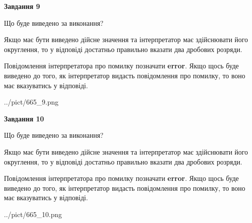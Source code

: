 \documentclass[12pt, ukrainian]{article}
\begin{document}
{\begin {Large}
{\begin {center}\textbf{Завдання 9}\end {center}}\par
Що буде виведено за виконання? \par

Якщо має бути виведено дійсне значення та інтерпретатор має здійснювати його округлення, 
то у відповіді достатньо правильно вказати два дробових розряди.

Повідомлення інтерпретатора про помилку позначати \textbf{error}.
Якщо щось буде виведено до того, як інтерпретатор видасть повідомлення про помилку, 
то воно має вказуватись у відповіді. \par

\begin{center}
	{../pict/665_9.png}
\end{center}
\newpage

{\begin {center}\textbf{Завдання 10}\end {center}}\par
Що буде виведено за виконання? \par

Якщо має бути виведено дійсне значення та інтерпретатор має здійснювати його округлення, 
то у відповіді достатньо правильно вказати два дробових розряди.

Повідомлення інтерпретатора про помилку позначати \textbf{error}.
Якщо щось буде виведено до того, як інтерпретатор видасть повідомлення про помилку, 
то воно має вказуватись у відповіді. \par

\begin{center}
	{../pict/665_10.png}
\end{center}
\newpage

\end {Large}}
\end{document}
